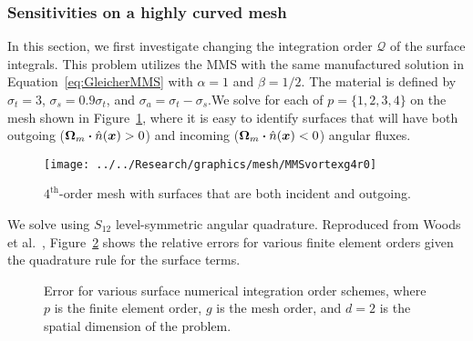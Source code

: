\documentclass[12pt,letterpaper]{article}
\begin{document}
\subsubsection{Sensitivities on a highly curved mesh}
\label{sec:InOutSensitivity}
In this section, we first investigate changing the integration order $\mathcal{Q}$ of the surface integrals. This problem utilizes the MMS with the same manufactured solution in Equation~\ref{eq:GleicherMMS} with $\alpha=1$ and $\beta=1/2$. The material is defined by $\sigma_t=3$, $\sigma_s=0.9 \sigma_t$, and $\sigma_a=\sigma_t-\sigma_s$.We solve for each of $p=\{1,2,3,4 \}$ on the mesh shown in Figure~\ref{fig:InOutMesh}, where it is easy to identify surfaces that will have both outgoing ($\bm{\Omega}_m \bm{\cdot} \hat{n}(\bm{x}) > 0$) and incoming ($\bm{\Omega}_m \bm{\cdot} \hat{n}(\bm{x}) < 0$) angular fluxes.
%
\begin{figure}[!htb]
\centering
\texttt{[image: ../../Research/graphics/mesh/MMSvortexg4r0]}
\caption{$4^\text{th}$-order mesh with surfaces that are both incident and outgoing.}
\label{fig:InOutMesh}
\end{figure}
%
We solve using $S_{12}$ level-symmetric angular quadrature. Reproduced from Woods et al.~\cite{Woods2018HOSnXY}, Figure~\ref{fig:GleicherS12g4r0SurfaceOrder} shows the relative errors for various finite element orders given the quadrature rule for the surface terms.
%
\begin{figure}[!htb]
\centering
{}
\caption{Error for various surface numerical integration order schemes, where $p$ is the finite element order, $g$ is the mesh order, and $d=2$ is the spatial dimension of the problem.}
\label{fig:GleicherS12g4r0SurfaceOrder}
\end{figure}
\end{document}
